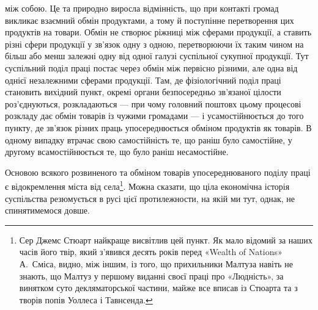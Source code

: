 \parcont{}  %
між собою. Це та природно виросла відмінність, що при контакті
громад викликає взаємний обмін продуктами, а тому й поступінне
перетворення цих продуктів на товари. Обмін не створює ріжниці
між сферами продукції, а ставить різні сфери продукції у зв’язок
одну з одною, перетворюючи їх таким чином на більш або менш
залежні одну від одної галузі суспільної сукупної продукції.
Тут суспільний поділ праці постає через обмін між первісно різними,
але одна від однієї незалежними сферами продукції. Там,
де фізіологічний поділ праці становить вихідний пункт, окремі
органи безпосередньо зв’язаної цілости роз’єднуються, розкладаються
— при чому головний поштовх цьому процесові розкладу
дає обмін товарів із чужими громадами — і усамостійнюється
до того пункту, де зв’язок різних праць упосереднюється обміном
продуктів як товарів. В одному випадку втрачає свою самостійність
те, що раніш було самостійне, у другому всамостійнюється
те, що було раніш несамостійне.

Основою всякого розвиненого та обміном товарів упосереднюваного
поділу праці є відокремлення міста від села\footnote{
Сер Джемс Стюарт найкраще висвітлив цей пункт. Як мало відомий
за наших часів його твір, який з’явився десять років перед «Wealth
of Nations» А.~Сміса, видно, між іншим, із того, що прихильники
Малтуза навіть не знають, що Малтуз у першому виданні своєї праці
про «Людність», за винятком суто декляматорської частини, майже все
вписав із Стюарта та з творів попів Уоллеса і Тавнсенда.
}. Можна
сказати, що ціла економічна історія суспільства резюмується
в русі цієї протилежности, на якій ми тут, однак, не спинятимемося
довше.

